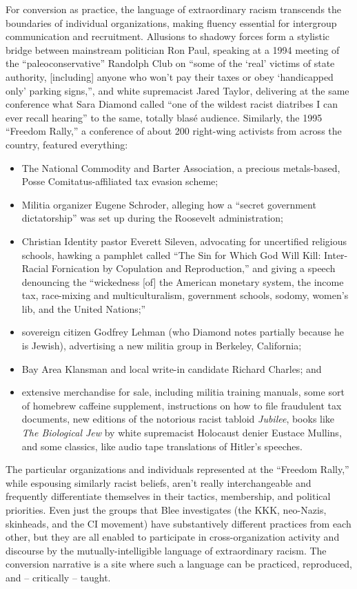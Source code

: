 \documentclass[11pt]{article}
\begin{document}
For conversion as practice, the language of extraordinary racism transcends the boundaries of individual organizations, making fluency essential for intergroup communication and recruitment. Allusions to shadowy forces form a stylistic bridge between mainstream politician Ron Paul, speaking at a 1994 meeting of the ``paleoconservative'' Randolph Club on ``some of the `real' victims of state authority, [including] anyone who won't pay their taxes or obey `handicapped only' parking signs,''\autocite[182]{Di96}, and white supremacist Jared Taylor, delivering at the same conference what Sara Diamond called ``one of the wildest racist diatribes I can ever recall hearing'' to the same, totally blas\'e audience.\autocite[183]{Di96} Similarly, the 1995 ``Freedom Rally,'' a conference of about 200 right-wing activists from across the country, featured everything:
\begin{itemize}
    \item The National Commodity and Barter Association, a precious metals-based, Posse Comitatus-affiliated tax evasion scheme;
    \item Militia organizer Eugene Schroder, alleging how a ``secret government dictatorship'' was set up during the Roosevelt administration;
    \item Christian Identity pastor Everett Sileven, advocating for uncertified religious schools, hawking a pamphlet called ``The Sin for Which God Will Kill: Inter-Racial Fornication by Copulation and Reproduction,'' and giving a speech denouncing the ``wickedness [of] the American monetary system, the income tax, race-mixing and multiculturalism, government schools, sodomy, women's lib, and the United Nations;''
    \item sovereign citizen Godfrey Lehman (who Diamond notes partially because he is Jewish), advertising a new militia group in Berkeley, California; 
    \item Bay Area Klansman and local write-in candidate Richard Charles; and
    \item extensive merchandise for sale, including militia training manuals, some sort of homebrew caffeine supplement, instructions on how to file fraudulent tax documents, new editions of the notorious racist tabloid \textit{Jubilee}, books like \textit{The Biological Jew} by white supremacist Holocaust denier Eustace Mullins, and some classics, like audio tape translations of Hitler's speeches.\autocite[210--214]{Di96}
\end{itemize}
The particular organizations and individuals represented at the ``Freedom Rally,'' while espousing similarly racist beliefs, aren't really interchangeable and frequently differentiate themselves in their tactics, membership, and political priorities. Even just the groups that Blee investigates (the KKK, neo-Nazis, skinheads, and the CI movement) have substantively different practices from each other, but they are all enabled to participate in cross-organization activity and discourse by the mutually-intelligible language of extraordinary racism. The conversion narrative is a site where such a language can be practiced, reproduced, and -- critically -- taught.
\end{document}
